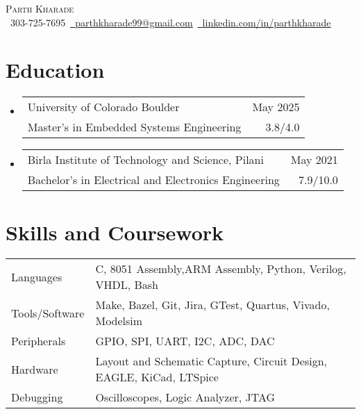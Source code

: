 \documentclass[11pt]{article}
\makeatletter
\newcommand{\resumeSubheadingEdu}[4]{
  \vspace{-2pt}\item
    \begin{tabular*}{1.0\textwidth}[t]{l@{\extracolsep{\fill}}r}
       {\large #1}&{\large #2} \\
       {#3} &{ #4} \\
    \end{tabular*}\vspace{-1pt}
}
\newcommand{\resumeSubHeadingListStart}{\begin{itemize}[leftmargin=0.0in, label={}]}
\newcommand{\resumeSubHeadingListEnd}{\end{itemize}}
\makeatother
\begin{document}
\setlength{\footskip}{4pt}
\begin{center}
  {\huge \scshape Parth Kharade} \\ \vspace{1pt}
  \small \raisebox{-0.1\height}\faPhone\ 303-725-7695{\hspace{0.1cm}}~\href{mailto:parthkharade99@gmail.com}{\raisebox{-0.2\height}\faEnvelope\ \underline{parthkharade99@gmail.com}}~{\hspace{0.1cm}}\href{https://www.linkedin.com/in/parth-k-081287184/}{\raisebox{-0.2\height}\faLinkedin\ \underline{linkedin.com/in/parthkharade}}
  \vspace{-10pt}
\end{center}



\section {Education}
\resumeSubHeadingListStart
\resumeSubheadingEdu
{University of Colorado Boulder}{May 2025}
{Master's in Embedded Systems Engineering}{3.8/4.0}
\vspace{-0.1in}
\resumeSubheadingEdu
{Birla Institute of Technology and Science, Pilani}{May 2021}
{Bachelor's in Electrical and Electronics Engineering}{7.9/10.0}
\resumeSubHeadingListEnd
\vspace{-16pt}
\section{Skills and Coursework}
\vspace{-4mm}
\begin{table}[!htb]
  \begin{tabular} { m{3.1cm} | m{15cm} }
    {Languages}           & {\: C, 8051 Assembly,ARM Assembly, Python, Verilog, VHDL, Bash}  \\
    {Tools/Software}      & {\: Make, Bazel, Git, Jira, GTest, Quartus, Vivado, Modelsim}     \\
    {Peripherals}         & {\: GPIO, SPI, UART, I2C, ADC, DAC}                 \\
    {Hardware}            & {\: Layout and Schematic Capture, Circuit Design, EAGLE, KiCad, LTSpice}                        \\
    {Debugging}           & {\: Oscilloscopes, Logic Analyzer, JTAG}\\
  \end{tabular}
\end{table}
\vspace{-16pt}
\end{document}

